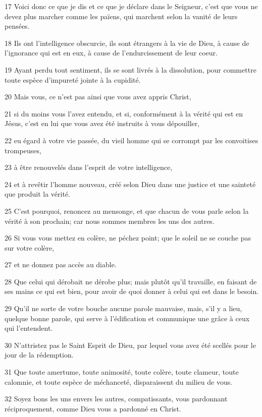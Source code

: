 \par 17 Voici donc ce que je dis et ce que je déclare dans le Seigneur, c'est que vous ne devez plus marcher comme les païens, qui marchent selon la vanité de leurs pensées.
\par 18 Ils ont l'intelligence obscurcie, ils sont étrangers à la vie de Dieu, à cause de l'ignorance qui est en eux, à cause de l'endurcissement de leur coeur.
\par 19 Ayant perdu tout sentiment, ils se sont livrés à la dissolution, pour commettre toute espèce d'impureté jointe à la cupidité.
\par 20 Mais vous, ce n'est pas ainsi que vous avez appris Christ,
\par 21 si du moins vous l'avez entendu, et si, conformément à la vérité qui est en Jésus, c'est en lui que vous avez été instruits à vous dépouiller,
\par 22 eu égard à votre vie passée, du vieil homme qui se corrompt par les convoitises trompeuses,
\par 23 à être renouvelés dans l'esprit de votre intelligence,
\par 24 et à revêtir l'homme nouveau, créé selon Dieu dans une justice et une sainteté que produit la vérité.
\par 25 C'est pourquoi, renoncez au mensonge, et que chacun de vous parle selon la vérité à son prochain; car nous sommes membres les uns des autres.
\par 26 Si vous vous mettez en colère, ne péchez point; que le soleil ne se couche pas sur votre colère,
\par 27 et ne donnez pas accès au diable.
\par 28 Que celui qui dérobait ne dérobe plus; mais plutôt qu'il travaille, en faisant de ses mains ce qui est bien, pour avoir de quoi donner à celui qui est dans le besoin.
\par 29 Qu'il ne sorte de votre bouche aucune parole mauvaise, mais, s'il y a lieu, quelque bonne parole, qui serve à l'édification et communique une grâce à ceux qui l'entendent.
\par 30 N'attristez pas le Saint Esprit de Dieu, par lequel vous avez été scellés pour le jour de la rédemption.
\par 31 Que toute amertume, toute animosité, toute colère, toute clameur, toute calomnie, et toute espèce de méchanceté, disparaissent du milieu de vous.
\par 32 Soyez bons les uns envers les autres, compatissants, vous pardonnant réciproquement, comme Dieu vous a pardonné en Christ.

